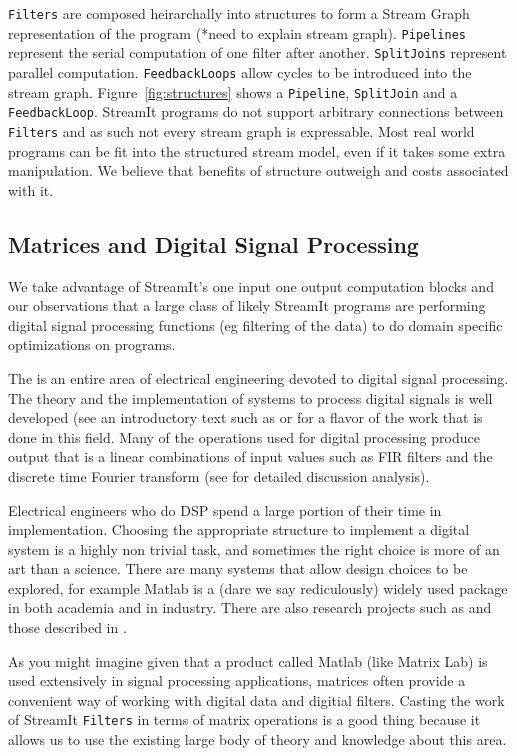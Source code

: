{\tt Filters} are composed heirarchally into structures to form
a Stream Graph representation of the program (*need to explain stream graph). 
{\tt Pipelines} represent the serial computation of one filter after another.
{\tt SplitJoins} represent parallel computation. {\tt FeedbackLoops} allow cycles
to be introduced into the stream graph. Figure~\ref{fig:structures} shows a {\tt Pipeline},
{\tt SplitJoin} and a {\tt FeedbackLoop}. StreamIt programs do not support arbitrary connections
between {\tt Filters} and as such not every stream graph is expressable. Most real world programs
can be fit into the structured stream model, even if it takes some extra manipulation. We believe
that benefits of structure outweigh and costs associated with it.

\subsection{Matrices and Digital Signal Processing}
We take advantage of StreamIt's one input one output computation blocks and 
our observations that a large class of likely StreamIt programs are performing
digital signal processing functions (eg filtering of the data) to do domain specific
optimizations on programs.

The is an entire area of electrical engineering devoted to digital signal processing. The
theory and the implementation of systems to process digital signals is well developed (see
an introductory text such as\cite{oppenheim-discrete} or \cite{lyons-understanding} for 
a flavor of the work that is done in this field. Many of the operations used for digital 
processing produce output that is a linear combinations of input values such as FIR filters and
the discrete time Fourier transform (see \cite{oppenheim-discrete} for detailed discussion
analysis).

Electrical engineers who do DSP spend a large portion of their time in implementation. Choosing
the appropriate structure to implement a digital system is a highly non trivial task, and sometimes
the right choice is more of an art than a science. There are many systems that allow design choices
to be explored, for example Matlab\cite{matlab} is a (dare we say rediculously) widely used package 
in both academia and in industry. There are also research projects such as \cite{covell-ade} 
and those described in \cite{oppenheim-symbolic}. 

As you might imagine given that a product called Matlab (like Matrix Lab) is used extensively
in signal processing applications, matrices often provide a convenient way of working with
digital data and digitial filters. Casting the work of StreamIt {\tt Filters} in terms 
of matrix operations is a good thing because it allows us to use the existing large body
of theory and knowledge about this area. 

